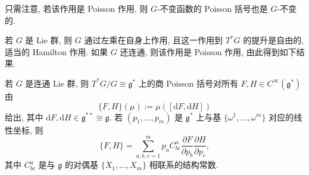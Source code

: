 \begin{RiemannProof}
只需注意, 若该作用是 Poisson 作用, 则 $G$-不变函数的 Poisson 括号也是 $G$-不变的.
\end{RiemannProof}

若 $G$ 是 Lie 群, 则 $G$ 通过左乘在自身上作用, 且这一作用到 $T^*G$ 的提升是自由的, 适当的 Hamilton 作用. 如果 $G$ 还连通, 则该作用是 Poisson 作用, 由此得到如下结果.

\begin{RiemannTheorem}\label{thm:lie-poisson-reduction}
若 $G$ 是连通 Lie 群, 则 $T^*G/G\cong\mathfrak{g}^*$ 上的商 Poisson 括号对所有 $F,H\in C^\infty(\mathfrak{g}^*)$ 由
\[
  \{F,H\}(\mu):=\mu([\mathrm{d}F,\mathrm{d}H])
\]
给出, 其中 $\mathrm{d}F,\mathrm{d}H\in\mathfrak{g}^{**}\cong\mathfrak{g}$. 若 $(p_1,\ldots,p_m)$ 是 $\mathfrak{g}^*$ 上与基 $\{\omega^1,\ldots,\omega^m\}$ 对应的线性坐标, 则
\[
  \{F,H\}=\sum_{a,b,c=1}^m p_aC_{bc}^a\frac{\partial F}{\partial p_b}\frac{\partial H}{\partial p_c},
\]
其中 $C_{bc}^a$ 是与 $\mathfrak{g}$ 的对偶基 $\{X_1,\ldots,X_m\}$ 相联系的结构常数.
\end{RiemannTheorem}

